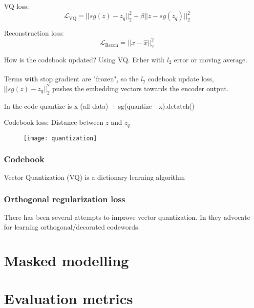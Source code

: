 \documentclass[../../thesis.tex]{subfiles}
\begin{document}
VQ loss: 
\begin{equation}
    \mathcal{L}_{\text{VQ}} = ||sg(z) - z_q||_2^2 +\beta||z - sg(z_q)||_2^2
\end{equation}
     
Reconstruction loss:
\begin{equation}
    \mathcal{L}_{\text{Recon}} = ||x - \widehat{x}||_2^2
\end{equation}

How is the codebook updated? Using VQ. Ether with $l_2$ error or moving average. \\\\

Terms with stop gradient are "frozen", so the $l_2$ codebook update loss, $||sg(z) - z_q ||_2^2$ pushes the embedding vectors towards the encoder output. 

In the code quantize is x (all data) + sg(quantize - x).detatch()



Codebook loss: Distance between $z$ and $z_q$ 


\begin{figure}[h]
    \texttt{[image: quantization]}
    \centering    
\end{figure}





\subsubsection{Codebook}
Vector Quantization (VQ) is a dictionary learning algorithm 

\subsubsection{Orthogonal regularization loss}
There has been several attempts to improve vector quantization. In \cite{shin2023exploration} they advocate for learning orthogonal/decorated codewords. 



\section{Masked modelling}


\section{Evaluation metrics}
\end{document}
